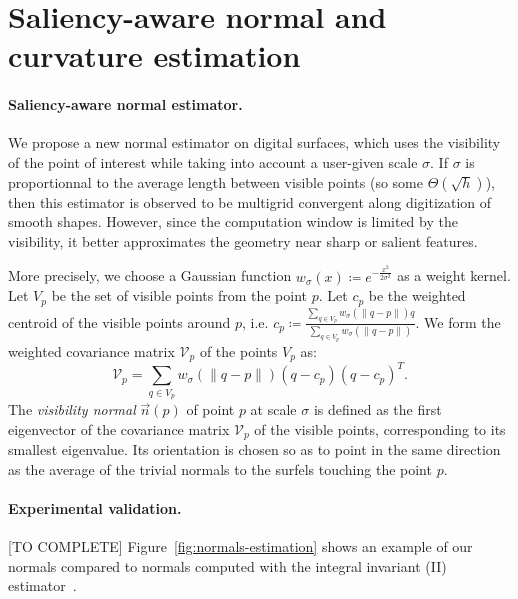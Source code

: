\documentclass[runningheads]{llncs}
\begin{document}


    \section{Saliency-aware normal and curvature estimation}

    \newcommand{\Kernel}[1]{\ensuremath{w_{\sigma}(#1)}}

    \paragraph{Saliency-aware normal estimator.}
    We propose a new normal estimator on digital surfaces, which uses
    the visibility of the point of interest while taking into account
    a user-given scale $\sigma$. If $\sigma$ is proportionnal to the
    average length between visible points (so some
    $\Theta(\sqrt{h})$), then this estimator is observed to be
    multigrid convergent along digitization of smooth shapes. However,
    since the computation window is limited by the visibility, it
    better approximates the geometry near sharp or salient features.

    More precisely, we choose a Gaussian function
    $\Kernel{x}\coloneqq e^{-\frac{x^2}{2\sigma^2}}$ as a weight kernel. Let
    $V_p$ be the set of visible points from the point $p$. Let $c_p$
    be the weighted centroid of the visible points around $p$,
    i.e. $c_p \coloneqq \frac{\sum_{q \in V_p} \Kernel{\|q-p\|}q}{\sum_{q \in
    V_p} \Kernel{\|q-p\|}}$. We form the weighted covariance matrix
    $\mathcal{V}_p$ of the points $V_p$ as:
    \begin{equation}
        \mathcal{V}_p = \sum_{q \in V_p} \Kernel{\|q-p\|}(q - c_p)(q - c_p)^T.
    \end{equation}
    The \emph{visibility normal} $\vec{n}(p)$ of point $p$ at scale $\sigma$ is defined
    as the first eigenvector of the covariance matrix $\mathcal{V}_p$
    of the visible points, corresponding to its smallest
    eigenvalue. Its orientation is chosen so as to point in the same
    direction as the average of the trivial normals to the surfels
    touching the point $p$.


    \paragraph{Experimental validation.} [TO COMPLETE]
    Figure~\ref{fig:normals-estimation} shows an example
    of our normals compared to normals computed with the integral invariant (II) estimator~\cite{Lachaud:2017-lnm}.
\end{document}
